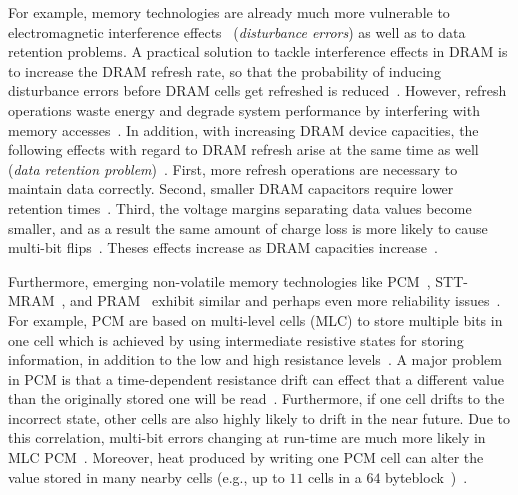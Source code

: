 For example, memory technologies are already much more vulnerable to electromagnetic interference effects~\cite{DBLP:conf/isca/KimDKFLLWLM14,DBLP:conf/date/Mutlu17} (\emph{disturbance errors}) as well as to data retention problems. A practical solution to tackle interference effects in DRAM is to increase the DRAM refresh rate, so that the probability of inducing disturbance errors before DRAM cells get refreshed is reduced~\cite{DBLP:conf/isca/KimDKFLLWLM14,DBLP:conf/date/Mutlu17}. However, refresh operations waste energy and degrade system performance by interfering with memory accesses~\cite{DBLP:conf/isca/KimDKFLLWLM14,DBLP:conf/date/Mutlu17}. In addition, with increasing DRAM device capacities, the following effects with regard to DRAM refresh arise at the same time as well (\emph{data retention problem})~\cite{Khan:2014:EEM:2637364.2592000,DBLP:conf/dsn/KhanLM16,Liu:2013:ESD:2508148.2485928,DBLP:conf/date/Mutlu17}. First, more refresh operations are necessary to maintain data correctly. Second, smaller DRAM capacitors require lower retention times~\cite{DBLP:conf/date/Mutlu17}. Third, the voltage margins separating data values become smaller, and as a result the same amount of charge loss is more likely to cause multi-bit flips~\cite{Khan:2014:EEM:2637364.2592000,DBLP:conf/dsn/KhanLM16,Liu:2013:ESD:2508148.2485928,DBLP:conf/date/Mutlu17}. Theses effects increase as DRAM capacities increase~\cite{Khan:2014:EEM:2637364.2592000,DBLP:conf/dsn/KhanLM16,Liu:2013:ESD:2508148.2485928,DBLP:conf/date/Mutlu17}.

Furthermore, emerging non-volatile memory technologies like PCM~\cite{DBLP:conf/isca/LeeIMB09}, STT-MRAM~\cite{DBLP:conf/ispass/KultursayKSM13}, and PRAM~\cite{DBLP:journals/pieee/WongLYCWCLCT12} exhibit similar and perhaps even more reliability issues~\cite{Khan:2014:EEM:2637364.2592000,DBLP:conf/dsn/KhanLM16,Liu:2013:ESD:2508148.2485928,DBLP:conf/date/Mutlu17}. For example, PCM are based on multi-level cells (MLC) to store multiple bits in one cell which is achieved by using intermediate resistive states for storing information, in addition to the low and high resistance levels~\cite{DBLP:journals/computers/Mittal17}. A major problem in PCM is that a time-dependent resistance drift can effect that a different value than the originally stored one will be read~\cite{DBLP:journals/computers/Mittal17}. Furthermore, if one cell drifts to the incorrect state, other cells are also highly likely to drift in the near future. Due to this correlation, multi-bit errors changing at run-time are much more likely in MLC PCM~\cite{DBLP:journals/computers/Mittal17}. Moreover, heat produced by writing one PCM cell can alter the value stored in many nearby cells (e.g., up to $11$ cells in a $64$ byteblock~\cite{DBLP:conf/dsn/JiangZY14})~\cite{DBLP:journals/computers/Mittal17}.

